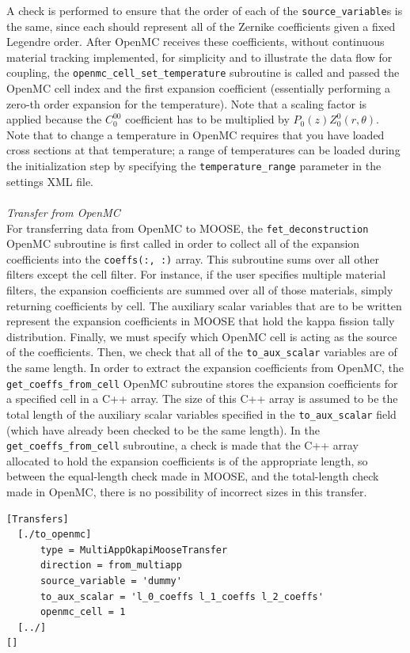 \documentclass[10pt]{article}
\numberwithin{equation}{section} %
\begin{document}
A check is performed to ensure that the order of each of the {\tt source\_variable}s is the same, since each should represent all of the Zernike coefficients given a fixed Legendre order. After OpenMC receives these coefficients, without continuous material tracking implemented, for simplicity and to illustrate the data flow for coupling, the {\tt openmc\_cell\_set\_temperature} subroutine is called and passed the OpenMC cell index and the first expansion coefficient (essentially performing a zero-th order expansion for the temperature). Note that a scaling factor is applied because the \(C_0^{00}\) coefficient has to be multiplied by \(P_0(z)Z_0^0(r,\theta)\). Note that to change a temperature in OpenMC requires that you have loaded cross sections at that temperature; a range of temperatures can be loaded during the initialization step by specifying the {\tt temperature\_range} parameter in the settings XML file.
\\\\
{\it Transfer from OpenMC}\\
For transferring data from OpenMC to MOOSE, the {\tt fet\_deconstruction} OpenMC subroutine is first called in order to collect all of the expansion coefficients into the {\tt coeffs(:, :)} array. This subroutine sums over all other filters except the cell filter. For instance, if the user specifies multiple material filters, the expansion coefficients are summed over all of those materials, simply returning coefficients by cell. The auxiliary scalar variables that are to be written represent the expansion coefficients in MOOSE that hold the kappa fission tally distribution. Finally, we must specify which OpenMC cell is acting as the source of the coefficients. Then, we check that all of the {\tt to\_aux\_scalar} variables are of the same length. In order to extract the expansion coefficients from OpenMC, the {\tt get\_coeffs\_from\_cell} OpenMC subroutine stores the expansion coefficients for a specified cell in a C++ array. The size of this C++ array is assumed to be the total length of the auxiliary scalar variables specified in the {\tt to\_aux\_scalar} field (which have already been checked to be the same length). In the {\tt get\_coeffs\_from\_cell} subroutine, a check is made that the C++ array allocated to hold the expansion coefficients is of the appropriate length, so between the equal-length check made in MOOSE, and the total-length check made in OpenMC, there is no possibility of incorrect sizes in this transfer.

\begin{lstlisting}
[Transfers]
  [./to_openmc]
      type = MultiAppOkapiMooseTransfer
      direction = from_multiapp
      source_variable = 'dummy'
      to_aux_scalar = 'l_0_coeffs l_1_coeffs l_2_coeffs'
      openmc_cell = 1
  [../]
[]
\end{lstlisting}
\end{document}
